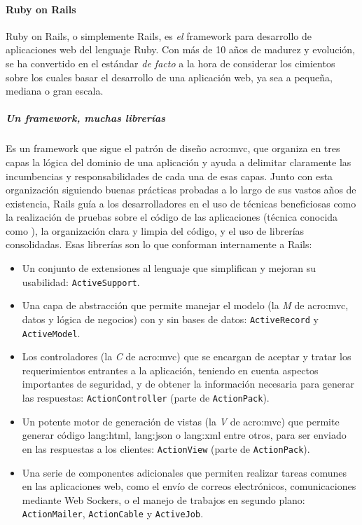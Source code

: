 \paragraph{Ruby on Rails}
\label{soa:tecnologias:rails}

Ruby on Rails, o simplemente Rails, es \textit{el} framework para desarrollo de aplicaciones web del lenguaje Ruby. Con más de 10 años de madurez y evolución, se ha convertido en el estándar \textit{de facto} a la hora de considerar los cimientos sobre los cuales basar el desarrollo de una aplicación web, ya sea a pequeña, mediana o gran escala.

\subparagraph{Un framework, muchas librerías}

Es un framework que sigue el patrón de diseño \gls{acro:mvc}, que organiza en tres capas la lógica del dominio de una aplicación y ayuda a delimitar claramente las incumbencias y responsabilidades de cada una de esas capas. Junto con esta organización siguiendo buenas prácticas probadas a lo largo de sus vastos años de existencia, Rails guía a los desarrolladores en el uso de técnicas beneficiosas como la realización de pruebas sobre el código de las aplicaciones (técnica conocida como ), la organización clara y limpia del código, y el uso de librerías consolidadas. Esas librerías son lo que conforman internamente a Rails:

\begin{itemize}
  \item Un conjunto de extensiones al lenguaje que simplifican y mejoran su usabilidad: \texttt{ActiveSupport}.
  \item Una capa de abstracción que permite manejar el modelo (la \textit{M} de \gls{acro:mvc}, datos y lógica de negocios) con y sin bases de datos: \texttt{ActiveRecord} y \texttt{ActiveModel}.
  \item Los controladores (la \textit{C} de \gls{acro:mvc}) que se encargan de aceptar y tratar los requerimientos entrantes a la aplicación, teniendo en cuenta aspectos importantes de seguridad, y de obtener la información necesaria para generar las respuestas: \texttt{ActionController} (parte de \texttt{ActionPack}).
  \item Un potente motor de generación de vistas (la \textit{V} de \gls{acro:mvc}) que permite generar código \gls{lang:html}, \gls{lang:json} o \gls{lang:xml} entre otros, para ser enviado en las respuestas a los clientes: \texttt{ActionView} (parte de \texttt{ActionPack}).
  \item Una serie de componentes adicionales que permiten realizar tareas comunes en las aplicaciones web, como el envío de correos electrónicos, comunicaciones mediante Web Sockers, o el manejo de trabajos en segundo plano: \texttt{ActionMailer}, \texttt{ActionCable} y \texttt{ActiveJob}.
\end{itemize}

